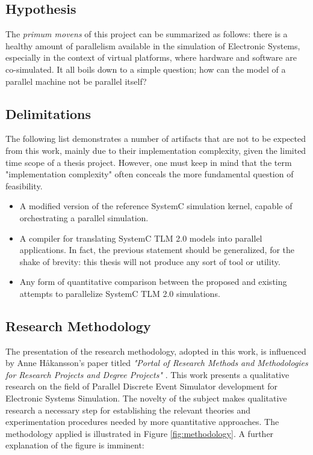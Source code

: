 \documentclass[11pt]{article}
\begin{document}
\subsection{Hypothesis}
\label{sec:org32a3acb}
The \textit{primum movens} of this project can be summarized as follows: there is a healthy amount of parallelism available in the simulation of Electronic Systems, especially in the context of virtual platforms, where hardware and software are co-simulated.
It all boils down to a simple question; how can the model of a parallel machine not be parallel itself?

\subsection{Delimitations}
\label{sec:orgc452965}
The following list demonstrates a number of artifacts that are not to be expected from this work, mainly due to their implementation complexity, given the limited time scope of a thesis project.
However, one must keep in mind that the term "implementation complexity" often conceals the more fundamental question of feasibility.

\begin{itemize}
\item A modified version of the reference SystemC simulation kernel, capable of orchestrating a parallel simulation.

\item A compiler for translating SystemC TLM 2.0 models into parallel applications. In fact, the previous statement should be generalized, for the shake of brevity:
this thesis will not produce any sort of tool or utility.

\item Any form of quantitative comparison between the proposed and existing attempts to parallelize SystemC TLM 2.0 simulations.
\end{itemize}

\subsection{Research Methodology}
\label{sec:orgc111d0f}
The presentation of the research methodology, adopted in this work, is influenced by Anne Håkansson's paper titled \textit{"Portal of Research Methods and Methodologies for Research Projects and Degree Projects"} \cite{Hakansson2013}.
This work presents a qualitative research on the field of Parallel Discrete Event Simulator development for Electronic Systems Simulation.
The novelty of the subject makes qualitative research a necessary step for establishing the relevant theories and experimentation procedures needed by more quantitative approaches.
The methodology applied is illustrated in Figure \ref{fig:methodology}.
A further explanation of the figure is imminent:
\end{document}
